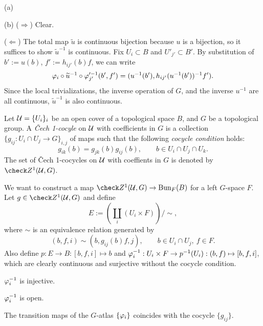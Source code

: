 \documentclass{../../large}
\begin{document}
\begin{pf}
(a)

(b)
($\Rightarrow$)
Clear.

($\Leftarrow$)
The total map $\tilde u$ is continuous bijection because $u$ is a bijection, so it suffices to show $\tilde u^{-1}$ is continuous.
Fix $U_i\subset B$ and $U'_{j'}\subset B'$.
By substitution of $b':=u(b)$, $f':=h_{ij'}(b)f$, we can write
\[\varphi_i\circ\widetilde u^{-1}\circ\varphi_{j'}'^{-1}(b',f')=(u^{-1}(b'),h_{ij'}(u^{-1}(b'))^{-1}f').\]
Since the local trivializations, the inverse operation of $G$, and the inverse $u^{-1}$ are all continuous, $\tilde u^{-1}$ is also continuous.
\end{pf}



\begin{prb}
Let $\mathcal{U}=\{U_i\}_i$ be an open cover of a topological space $B$, and $G$ be a topological group.
A \emph{\v Cech 1-cocyle} on $\mathcal{U}$ with coefficients in $G$ is a collection $\{g_{ij}:U_i\cap U_j\to G\}_{i,j}$ of maps such that the following \emph{cocycle condition} holds:
\[g_{ik}(b)=g_{jk}(b)g_{ij}(b),\qquad b\in U_i\cap U_j\cap U_k.\]
The set of \v Cech 1-cocycles on $\mathcal{U}$ with coeffients in $G$ is denoted by $\check Z^1(\cU,G)$.

We want to construct a map $\check Z^1(\cU,G)\to\mathrm{Bun}_F(B)$ for a left $G$-space $F$.
Let $g\in\check Z^1(\cU,G)$ and define
\[E:=\left(\coprod_i(U_i\times F)\right)/\sim,\]
where $\sim$ is an equivalence relation generated by
\[(b,f,i)\sim(b,g_{ij}(b)f,j),
\qquad b\in U_i\cap U_j,\ f\in F.\]
Also define $p:E\to B:[b,f,i]\mapsto b$ and $\varphi_i^{-1}:U_i\times F\to p^{-1}(U_i):(b,f)\mapsto[b,f,i]$, which are clearly continuous and surjective without the cocycle condition.
\begin{parts}
\item $\varphi_i^{-1}$ is injective.
\item $\varphi_i^{-1}$ is open.
\item The transition maps of the $G$-atlas $\{\varphi_i\}$ coincides with the cocycle $\{g_{ij}\}$.
\end{parts}
\end{prb}
\end{document}
